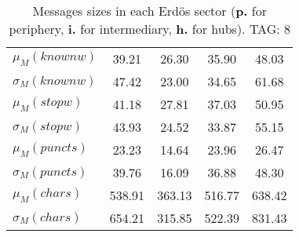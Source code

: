 \begin{table}[h!]
\begin{center}
\begin{tabular}{| l || c | c | c | c |}
$\mu_M(knownw)$ & 39.21  & 26.30  & 35.90  & 48.03 \\
$\sigma_M(knownw)$ & 47.42  & 23.00  & 34.65  & 61.68 \\\hline
$\mu_M(stopw)$ & 41.18  & 27.81  & 37.03  & 50.95 \\
$\sigma_M(stopw)$ & 43.93  & 24.52  & 33.87  & 55.15 \\\hline
$\mu_M(puncts)$ & 23.23  & 14.64  & 23.96  & 26.47 \\
$\sigma_M(puncts)$ & 39.76  & 16.09  & 36.88  & 48.30 \\\hline
$\mu_M(chars)$ & 538.91  & 363.13  & 516.77  & 638.42 \\
$\sigma_M(chars)$ & 654.21  & 315.85  & 522.39  & 831.43 \\\hline
\end{tabular}
\caption{Messages sizes in each Erd\"os sector ({{\bf p.}} for periphery, {{\bf i.}} for intermediary, {{\bf h.}} for hubs). TAG: 8}
\end{center}
\end{table}